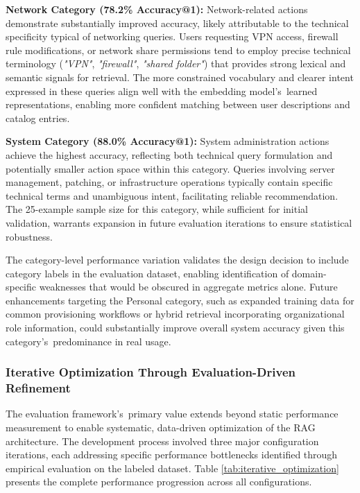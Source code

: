 \textbf{Network Category (78.2\% Accuracy@1):} Network-related actions demonstrate substantially improved accuracy, likely attributable to the technical specificity typical of networking queries. Users requesting VPN access, firewall rule modifications, or network share permissions tend to employ precise technical terminology (\textit{"VPN"}, \textit{"firewall"}, \textit{"shared folder"}) that provides strong lexical and semantic signals for retrieval. The more constrained vocabulary and clearer intent expressed in these queries align well with the embedding model's~learned representations, enabling more confident matching between user descriptions and catalog entries.

\textbf{System Category (88.0\% Accuracy@1):} System administration actions achieve the highest accuracy, reflecting both technical query formulation and potentially smaller action space within this category. Queries involving server management, patching, or infrastructure operations typically contain specific technical terms and unambiguous intent, facilitating reliable recommendation. The 25-example sample size for this category, while sufficient for initial validation, warrants expansion in future evaluation iterations to ensure statistical robustness.

The category-level performance variation validates the design decision to include category labels in the evaluation dataset, enabling identification of domain-specific weaknesses that would be obscured in aggregate metrics alone. Future enhancements targeting the Personal category, such as expanded training data for common provisioning workflows or hybrid retrieval incorporating organizational role information, could substantially improve overall system accuracy given this category's~predominance in real usage.

\subsubsection{Iterative Optimization Through Evaluation-Driven Refinement}

The evaluation framework's~primary value extends beyond static performance measurement to enable systematic, data-driven optimization of the RAG architecture. The development process involved three major configuration iterations, each addressing specific performance bottlenecks identified through empirical evaluation on the labeled dataset. Table \ref{tab:iterative_optimization} presents the complete performance progression across all configurations.


